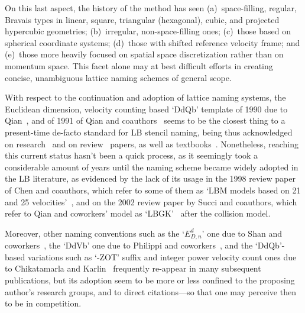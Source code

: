     On this last aspect, the history of the method has  seen  (a)~space-filling,  regular,  Bravais  types  in  linear,  square,
    triangular (hexagonal), cubic, and projected hypercubic geometries; (b)~irregular, non-space-filling ones;  (c)~those  based
    on spherical coordinate systems; (d)~those with shifted reference velocity frame; and  (e)~those  more  heavily  focused  on
    spatial space discretization rather than on momentum space. This facet alone may  at  best  difficult  efforts  in  creating
    concise, unambiguous lattice naming schemes of general scope.

    With respect to the continuation and adoption of lattice naming systems, the Euclidean dimension,  velocity  counting  based
    `DdQb'    template    of    1990    due    to    Qian~\cite{1990-QianYH-Paris},    and    of    1991     of     Qian     and
    coauthors~\cite{1991-QianYH+LallemandP-AdvKinTheoContMech} seems to be the closest thing to a present-time de-facto standard
    for   LB   stencil   naming,   being   thus   acknowledged   on   research~\cite{2008-RubinsteinR+LuoLS-PhysRev}   and    on
    review~\cite{2010-AidunCK+ClausenJR-AnnuRevFluidMech}   papers,   as   well   as    textbooks~\cite{2011-MohamadAA-Springer,
    2018-KrugerT+ViggenEM-Springer}. Nonetheless, reaching this current status hasn't been a quick process, as it seemingly took
    a considerable amount of years until the naming scheme became widely adopted in the LB literature, as evidenced by the  lack
    of its usage in the 1998 review paper of Chen and coauthors, which refer to some of them as `LBM models based on 21  and  25
    velocities'~\cite[p.~357]{1998-ChenS+DoolenGD-AnnuRevFluidMech}, and on the 2002 review paper by Succi and coauthors,  which
    refer to Qian and coworkers' model as `LBGK'~\cite[p.~1215]{2002-SucciS+ChenH-RevModPhys} after the collision model.

    Moreover,    other    naming    conventions    such    as    the     `$E_{D,n}^{d}$'     one     due     to     Shan     and
    coworkers~\cite{2006-ShanX+ChenH-JFluidMech},       the       `DdVb'       one       due       to        Philippi        and
    coworkers~\cite{2006-PhilippiPC+SurmasR-PhysRevE}, and the `DdQb'-based variations such as `-ZOT' suffix and  integer  power
    velocity count ones due to Chikatamarla and Karlin~\cite{2008-ChikatamarlaSS+KarlinIV-CompPhysComm} frequently re-appear  in
    many subsequent publications, but its adoption seem to be more or less confined to the proposing author's  research  groups,
    and to direct citations---so that one may perceive then to be in competition.

